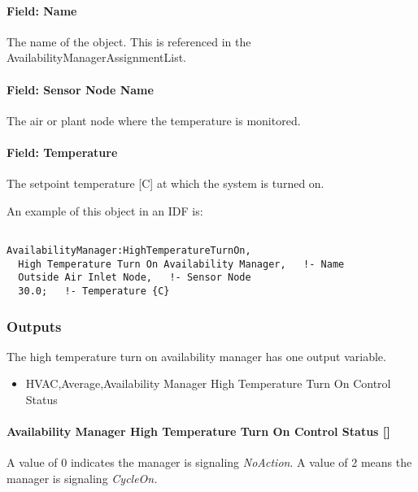\paragraph{Field: Name}\label{field-name-5-025}

The name of the object. This is referenced in the AvailabilityManagerAssignmentList.

\paragraph{Field: Sensor Node Name}\label{field-sensor-node-name-1-000}

The air or plant node where the temperature is monitored.

\paragraph{Field: Temperature}\label{field-temperature-1}

The setpoint temperature {[}C{]} at which the system is turned on.

An example of this object in an IDF is:

\begin{lstlisting}

AvailabilityManager:HighTemperatureTurnOn,
  High Temperature Turn On Availability Manager,   !- Name
  Outside Air Inlet Node,   !- Sensor Node
  30.0;   !- Temperature {C}
\end{lstlisting}

\subsubsection{Outputs}\label{outputs-5-010}

The high temperature turn on availability manager has one output variable.

\begin{itemize}
\tightlist
\item
  HVAC,Average,Availability Manager High Temperature Turn On Control Status
\end{itemize}

\paragraph{Availability Manager High Temperature Turn On Control Status {[]}}\label{availability-manager-high-temperature-turn-on-control-status}

A value of 0 indicates the manager is signaling \emph{NoAction}. A value of 2 means the manager is signaling \emph{CycleOn.}

